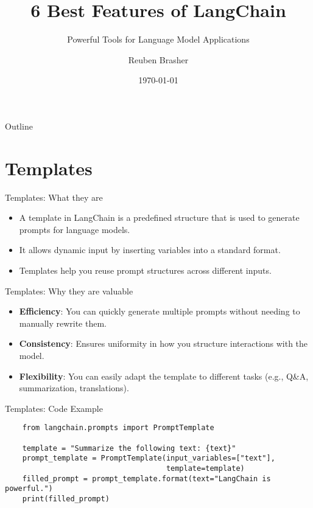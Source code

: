 \documentclass{beamer}
\title{6 Best Features of LangChain}
\subtitle{Powerful Tools for Language Model Applications}
\author{Reuben Brasher}
\date{\today}
\begin{document}
\begin{frame}
    \titlepage
\end{frame}

\begin{frame}{Outline}
    \tableofcontents
\end{frame}

\section{Templates}

\begin{frame}{Templates: What they are}
    \begin{itemize}
        \item A template in LangChain is a predefined structure that is used to generate prompts for language models.
        \item It allows dynamic input by inserting variables into a standard format.
        \item Templates help you reuse prompt structures across different inputs.
    \end{itemize}
\end{frame}

\begin{frame}{Templates: Why they are valuable}
    \begin{itemize}
        \item \textbf{Efficiency}: You can quickly generate multiple prompts without needing to manually rewrite them.
        \item \textbf{Consistency}: Ensures uniformity in how you structure interactions with the model.
        \item \textbf{Flexibility}: You can easily adapt the template to different tasks (e.g., Q\&A, summarization, translations).
    \end{itemize}
\end{frame}

\begin{frame}[fragile]{Templates: Code Example}
    \begin{verbatim}
    from langchain.prompts import PromptTemplate

    template = "Summarize the following text: {text}"
    prompt_template = PromptTemplate(input_variables=["text"],
                                     template=template)
    filled_prompt = prompt_template.format(text="LangChain is powerful.")
    print(filled_prompt)
    \end{verbatim}
\end{frame}
\end{document}
